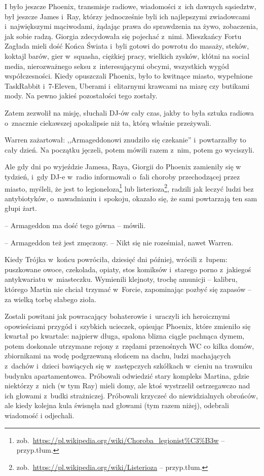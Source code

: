 \documentclass[oneside,polish,11pt,sfheadings]{mwbk}
\begin{document}
I było jeszcze Phoenix, transmisje radiowe, wiadomości z~ich dawnych
sąsiedztw, był jeszcze James i~Ray, którzy jednocześnie byli ich
najlepszymi zwiadowcami i~największymi mąciwodami, żądając prawa do
sprawdzenia na żywo, zobaczenia, jak sobie radzą. Giorgia zdecydowała
się pojechać z~nimi. Mieszkańcy Fortu Zagłada mieli dość Końca Świata i~byli gotowi do powrotu do masaży, steków, koktajl barów, gier w~squasha,
ciężkiej pracy, wielkich zysków, kłótni na social media, nierozważnego
seksu z~interesującymi obcymi, wszystkich wygód współczesności. Kiedy
opuszczali Phoenix, było to kwitnące miasto, wypełnione TaskRabbit i~7-Eleven, Uberami i~elitarnymi krawcami na miarę czy butikami mody. Na
pewno jakieś pozostałości tego zostały.

Zatem zezwolił na misję, słuchali DJ-ów cały czas, jakby to była sztuka
radiowa o~znacznie ciekawszej apokalipsie niż ta, którą właśnie
przeżywali.

Warren zażartował: ,,Armageddonowi znudziło się czekanie'' i~powtarzałby
to cały dzień. Na początku jęczeli, potem mówili razem z~nim, potem go
wyciszyli.

Ale gdy dni po wyjeździe Jamesa, Raya, Giorgii do Phoenix zamieniły się
w tydzień, i~gdy DJ-e w~radio informowali o~fali choroby przechodzącej
przez miasto, myśleli, że jest to legioneloza\footnote{zob.~\url{https://pl.wikipedia.org/wiki/Choroba\_legionist\%C3\%B3w}
-- przyp.tłum.} lub listerioza\footnote{ zob.~\url{https://pl.wikipedia.org/wiki/Listerioza} -- przyp.tłum.},
radzili jak leczyć ludzi bez antybiotyków, o~nawadnianiu i~spokoju,
okazało się, że sami powtarzają ten sam głupi żart. 

-- Armageddon ma dość
tego gówna -- mówili. 

-- Armageddon też jest zmęczony. -- Nikt się nie
roześmiał, nawet Warren.

Kiedy Trójka w~końcu powróciła, dziesięć dni później, wrócili z~łupem:
puszkowane owoce, czekolada, opiaty, stos komiksów i~starego porno z~jakiegoś antykwariatu w~miasteczku. Wymienili klejnoty, trochę amunicji
-- kalibru, którego Martin nie chciał trzymać w~Forcie, zapominając
pozbyć się zapasów -- za wielką torbę słabego zioła.

Zostali powitani jak powracający bohaterowie i~uraczyli ich heroicznymi
opowieściami przygód i~szybkich ucieczek, opisując Phoenix, które
zmieniło się kwartał po kwartale: najpierw długa, spalona blizna ciągle
pachnąca dymem, potem doskonale utrzymane rejony z~rzędami przenośnych
WC co kilka domów, zbiornikami na wodę podgrzewaną słońcem na dachu,
ludzi machających z~dachów i~dzieci bawiących się w~zastępczych
szkółkach w~cieniu na trawniku budynku apartamentowca. Próbowali
odwiedzić stary kompleks Martina, gdzie niektórzy z~nich (w tym Ray)
mieli domy, ale ktoś wystrzelił ostrzegawczo nad ich głowami z~budki
strażniczej. Próbowali krzyczeć do niewidzialnych obrońców, ale kiedy
kolejna kula świsnęła nad głowami (tym razem niżej), odebrali wiadomość
i odjechali.
\end{document}
